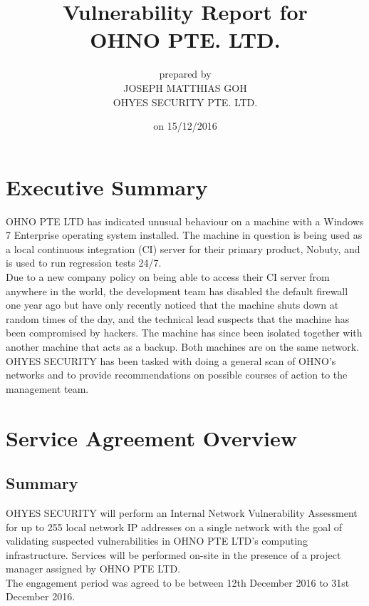 \documentclass[11pt, oneside]{article}   	%
\title{
	Vulnerability Report for\\
	OHNO PTE. LTD.
}
\author{
	prepared by\\
	JOSEPH MATTHIAS GOH\\
	OHYES SECURITY PTE. LTD.
}
\date{on 15/12/2016}
\begin{document}
\maketitle
\newpage

\tableofcontents
\newpage

\section{Executive Summary}
OHNO PTE LTD has indicated unusual behaviour on a machine
with a Windows 7 Enterprise operating system installed. The machine
in question is being used as a local continuous integration (CI) server
for their primary product, Nobuty, and is used to run regression tests 24/7.\\

Due to a new company policy on being able to access their CI server from
anywhere in the world, the development team has disabled the default
firewall one year ago but have only recently noticed that the machine
shuts down at random times of the day, and the technical lead suspects
that the machine has been compromised by hackers. The machine has since
been isolated together with another machine that acts as a backup. Both
machines are on the same network.\\

OHYES SECURITY has been tasked with doing a general scan of OHNO's 
networks and to provide recommendations on possible courses of action
to the management team.

\section{Service Agreement Overview}
\subsection{Summary}
OHYES SECURITY will perform an Internal Network Vulnerability Assessment
for up to 255 local network IP addresses on a single network with the goal
of validating suspected vulnerabilities in OHNO PTE LTD's 
computing infrastructure. Services will be performed on-site in the 
presence of a project manager assigned by OHNO PTE LTD.\\

The engagement period was agreed to be between 12th December 2016 to 31st December 2016.
\end{document}
